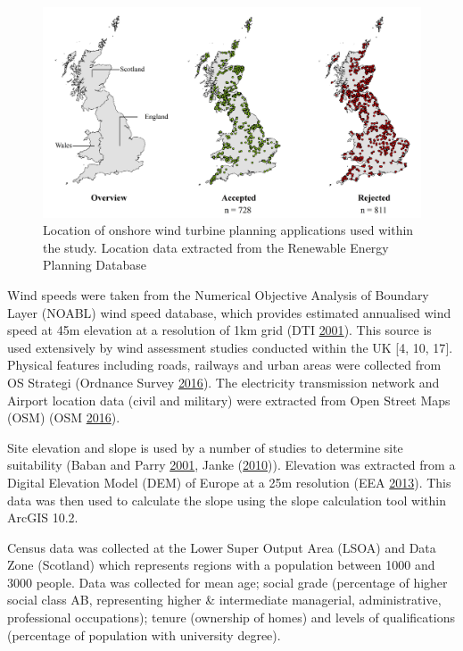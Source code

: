 \documentclass[a4paper,]{article}
\theoremstyle{definition}
\theoremstyle{definition}
\theoremstyle{remark}
\begin{document}
{\begin{figure}
\includegraphics[width=1\linewidth]{figures/StudyExtent} \caption{Location of onshore wind turbine planning applications used within the study. Location data extracted from the Renewable Energy Planning Database}\label{fig:StudyExtent}
\end{figure}

Wind speeds were taken from the Numerical Objective Analysis of Boundary
Layer (NOABL) wind speed database, which provides estimated annualised
wind speed at 45m elevation at a resolution of 1km grid (DTI
\protect\hyperlink{ref-DTI2001}{2001}). This source is used extensively
by wind assessment studies conducted within the UK {[}4, 10, 17{]}.
Physical features including roads, railways and urban areas were
collected from OS Strategi (Ordnance Survey
\protect\hyperlink{ref-Survey2016}{2016}). The electricity transmission
network and Airport location data (civil and military) were extracted
from Open Street Maps (OSM) (OSM
\protect\hyperlink{ref-Overpass2016}{2016}).

Site elevation and slope is used by a number of studies to determine
site suitability (Baban and Parry
\protect\hyperlink{ref-Baban2001}{2001}, Janke
(\protect\hyperlink{ref-Janke2010}{2010})). Elevation was extracted from
a Digital Elevation Model (DEM) of Europe at a 25m resolution (EEA
\protect\hyperlink{ref-EEA2013}{2013}). This data was then used to
calculate the slope using the slope calculation tool within ArcGIS 10.2.

Census data was collected at the Lower Super Output Area (LSOA) and Data
Zone (Scotland) which represents regions with a population between 1000
and 3000 people. Data was collected for mean age; social grade
(percentage of higher social class AB, representing higher \&
intermediate managerial, administrative, professional occupations);
tenure (ownership of homes) and levels of qualifications (percentage of
population with university degree).

}
\end{document}
